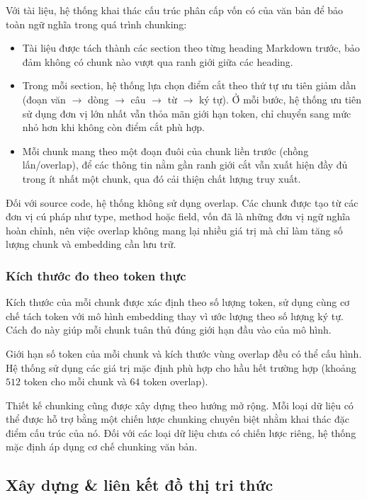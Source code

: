 Với tài liệu, hệ thống khai thác cấu trúc phân cấp vốn có của văn bản để bảo toàn ngữ nghĩa trong quá trình chunking:

\begin{itemize}
  \item Tài liệu được tách thành các section theo từng heading Markdown trước, bảo đảm không có chunk nào vượt qua ranh giới giữa các heading.
  \item Trong mỗi section, hệ thống lựa chọn điểm cắt theo thứ tự ưu tiên giảm dần (đoạn văn $\rightarrow$ dòng $\rightarrow$ câu $\rightarrow$ từ $\rightarrow$ ký tự). Ở mỗi bước, hệ thống ưu tiên sử dụng đơn vị lớn nhất vẫn thỏa mãn giới hạn token, chỉ chuyển sang mức nhỏ hơn khi không còn điểm cắt phù hợp.
  \item Mỗi chunk mang theo một đoạn đuôi của chunk liền trước (chồng lấn/overlap), để các thông tin nằm gần ranh giới cắt vẫn xuất hiện đầy đủ trong ít nhất một chunk, qua đó cải thiện chất lượng truy xuất.
\end{itemize}

Đối với source code, hệ thống không sử dụng overlap. Các chunk được tạo từ các đơn vị cú pháp như type, method hoặc field, vốn đã là những đơn vị ngữ nghĩa hoàn chỉnh, nên việc overlap không mang lại nhiều giá trị mà chỉ làm tăng số lượng chunk và embedding cần lưu trữ.

\subsubsection{Kích thước đo theo token thực}

Kích thước của mỗi chunk được xác định theo số lượng token, sử dụng cùng cơ chế tách token với mô hình embedding thay vì ước lượng theo số lượng ký tự. Cách đo này giúp mỗi chunk tuân thủ đúng giới hạn đầu vào của mô hình.

Giới hạn số token của mỗi chunk và kích thước vùng overlap đều có thể cấu hình. Hệ thống sử dụng các giá trị mặc định phù hợp cho hầu hết trường hợp (khoảng $512$ token cho mỗi chunk và $64$ token overlap).

Thiết kế chunking cũng được xây dựng theo hướng mở rộng. Mỗi loại dữ liệu có thể được hỗ trợ bằng một chiến lược chunking chuyên biệt nhằm khai thác đặc điểm cấu trúc của nó. Đối với các loại dữ liệu chưa có chiến lược riêng, hệ thống mặc định áp dụng cơ chế chunking văn bản.

\subsection{Xây dựng \& liên kết đồ thị tri thức}

